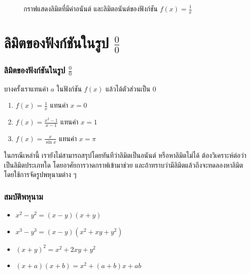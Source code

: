 \begin{frame}[t]
\begin{figure}[h!]
\centering
{}
\caption{กราฟแสดงลิมิตที่มีค่าอนันต์ และลิมิตอนันต์ของฟังก์ชัน $f(x) = \frac{1}{x}$}
\label{fig:limit_inf_all}
\end{figure}
\end{frame}


\section[ลิมิต $\tfrac{0}{0}$]{ลิมิตของฟังก์ชันในรูป $\frac{0}{0}$}
\frame{\sectionpage}


\begin{frame}[t]
\frametitle{ลิมิตของฟังก์ชันในรูป $\tfrac{0}{0}$}
บางครั้งเราแทนค่า $a$ ในฟังก์ชัน $f(x)$ แล้วได้ตัวส่วนเป็น 0 \pa
\begin{block}{}
\begin{enumerate}
\item $f(x) = \frac{1}{x}$ แทนค่า $x=0$ \pa
\item $f(x) = \frac{x^2-1}{x-1}$ แทนค่า $x=1$ \pa
\item $f(x) = \frac{x}{\sin x}$ แทนค่า $x = \pi$ \pa
\end{enumerate}
\end{block}
ในกรณีเหล่านี้ เรายังไม่สามารถสรุปโดยทันทีว่าลิมิตเป็นอนันต์ หรือหาลิมิตไม่ได้ ต้องวิเคราะห์ต่อว่าเป็นลิมิตประเภทใด โดยอาศัยการวาดกราฟเข้ามาช่วย และถ้าทราบว่ามีลิมิตแล้วถึงจะทดลองหาลิมิตโดยใช้การจัดรูปพหุนามต่าง ๆ
\end{frame}


\begin{frame}
\frametitle{สมบัติพหุนาม}
\begin{prop}{}{}
\begin{itemize}
\item $x^2 - y^2 = (x-y)(x+y)$
\item $x^3 - y^3 = (x-y)(x^2 + xy + y^2)$
\item $(x+y)^2 = x^2 + 2xy + y^2$
\item $(x+a)(x+b) = x^2 + (a+b)x + ab$ 
\end{itemize}
\end{prop}
\end{frame}


